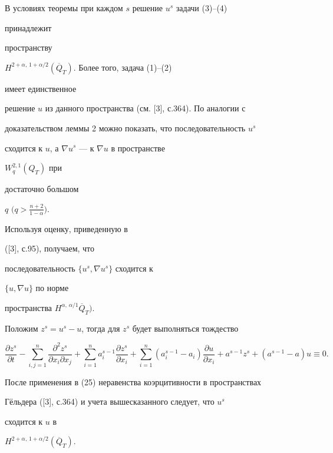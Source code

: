 \begin{pf}


В условиях теоремы при каждом $s$ решение $u^s$ задачи (3)--(4)


принадлежит


пространству


$H^{2+\alpha,\,1+\alpha/2}(\overline Q_T)$. Более того, задача (1)--(2)


имеет единственное


решение $u$ из данного пространства (см. [3], с.364). По аналогии с


доказательством леммы 2 можно показать, что последовательность $u^s$


сходится к $u$, а $\nabla u^s$ --- к $\nabla u$ в пространстве


$W^{2,1}_q(Q_T)$ при


достаточно большом


$q$ $\bigl(q>\frac{n+2}{1-\alpha}\bigr)$.


Используя оценку, приведенную в


([3], с.95), получаем, что


последовательность $\{u^s,\nabla u^s\}$ сходится к


$\{u,\nabla u\}$ по норме


пространства $H^{\alpha,\,\alpha/1}\overline Q_T)$.





Положим $z^s=u^s-u$, тогда для $z^s$ будет выполняться тождество


\begin{equation}


\frac{\partial z^s}{\partial t}-\sum^n_{i,j=1}


\frac{\partial^2 z^s}{\partial x_i\partial x_j}+


\sum^n_{i=1}a^{s-1}_i


\frac{\partial z^s}{\partial x_i}+\sum^n_{i=1}


(a^{s-1}_i-a_i)\frac{\partial u}{\partial x_i}+


a^{s-1}z^s+(a^{s-1}-a)u\equiv 0.


\end{equation}


После применения в (25) неравенства коэрцитивности в пространствах


Г\"ельдера ([3], с.364) и учета вышесказанного следует, что $u^s$


сходится к $u$ в


$H^{2+\alpha,\,1+\alpha/2}(\overline Q_T)$.


\end{pf}





